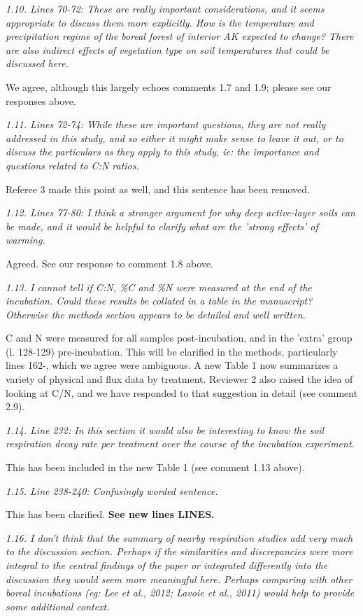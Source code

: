 \documentclass[11pt, oneside]{article}
\begin{document}
\medskip
{\it 1.10. Lines 70-72: These are really important considerations, and it seems appropriate to discuss them more explicitly. How is the temperature and precipitation regime of the boreal forest of interior AK expected to change? There are also indirect effects of vegetation type on soil temperatures that could be discussed here. }

We agree, although this largely echoes comments 1.7 and 1.9; please see our responses above.

\medskip
{\it 1.11. Lines 72-74: While these are important questions, they are not really addressed in this study, and so either it might make sense to leave it out, or to discuss the particulars as they apply to this study, ie: the importance and questions related to C:N ratios. }

Referee 3 made this point as well, and this sentence has been removed.

\medskip
{\it 1.12. Lines 77-80: I think a stronger argument for why deep active-layer soils can be made, and it would be helpful to clarify what are the 'strong effects' of warming. }

Agreed. See our response to comment 1.8 above.

\medskip
{\it 1.13. I cannot tell if C:N, \%C and \%N were measured at the end of the incubation. Could these results be collated in a table in the manuscript? Otherwise the methods section appears to be detailed and well written. }

C and N were measured for all samples post-incubation, and in the 'extra' group (l. 128-129) pre-incubation. This will be clarified in the methods, particularly lines 162-, which we agree were ambiguous. A new Table 1 now summarizes a variety of physical and flux data by treatment. Reviewer 2 also raised the idea of looking at C/N, and we have responded to that suggestion in detail (see comment 2.9).

\medskip
{\it 1.14. Line 232: In this section it would also be interesting to know the soil respiration decay rate per treatment over the course of the incubation experiment. }

This has been included in the new Table 1 (see comment 1.13 above).

\medskip
{\it 1.15. Line 238-240: Confusingly worded sentence. }

This has been clarified. {\bf See new lines LINES.}

\medskip
{\it 1.16. I don't think that the summary of nearby respiration studies add very much to the discussion section. Perhaps if the similarities and discrepancies were more integral to the central findings of the paper or integrated differently into the discussion they would seem more meaningful here. Perhaps comparing with other boreal incubations (eg: Lee et al., 2012; Lavoie et al., 2011) would help to provide some additional context. }
\end{document}
